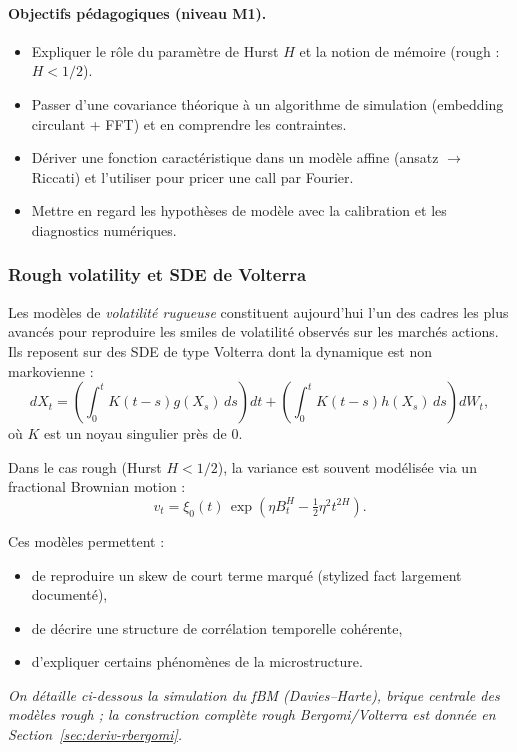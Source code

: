 \documentclass[11pt,a4paper]{article}
\newcommand{\1}{\mathbf{1}}
\begin{document}
\paragraph{Objectifs p\'edagogiques (niveau M1).}
\begin{itemize}
  \item Expliquer le r\^ole du param\`etre de Hurst $H$ et la notion de m\'emoire (rough : $H<1/2$).
  \item Passer d'une covariance th\'eorique \`a un algorithme de simulation (embedding circulant + FFT) et en comprendre les contraintes.
  \item D\'eriver une fonction caract\'eristique dans un mod\`ele affine (ansatz $\rightarrow$ Riccati) et l'utiliser pour pricer une call par Fourier.
  \item Mettre en regard les hypoth\`eses de mod\`ele avec la calibration et les diagnostics num\'eriques.
\end{itemize}

\subsubsection{Rough volatility et SDE de Volterra}

Les mod\`eles de \emph{volatilit\'e rugueuse} constituent aujourd'hui l'un des cadres
les plus avancés pour reproduire les smiles de volatilité observés sur les
marchés actions. Ils reposent sur des SDE de type Volterra dont la dynamique
est non markovienne :
\[
dX_t
=
\left(
 \int_0^t K(t-s) g(X_s)\, ds
\right) dt
+
\left(
 \int_0^t K(t-s) h(X_s)\, ds
\right) dW_t,
\]
o\`u $K$ est un noyau singulier près de $0$.

Dans le cas rough (Hurst $H<1/2$), la variance est souvent modélisée via un
fractional Brownian motion :
\[
v_t =
\xi_0(t)\,
\exp\!\left(
\eta B_t^H - \tfrac12 \eta^2 t^{2H}
\right).
\]

Ces mod\`eles permettent :
\begin{itemize}
  \item de reproduire un skew de court terme marqu\'e (stylized fact largement document\'e),
  \item de d\'ecrire une structure de corr\'elation temporelle cohérente,
  \item d'expliquer certains ph\'enom\`enes de la microstructure.
\end{itemize}

\emph{On d\'etaille ci-dessous la simulation du fBM (Davies--Harte), brique centrale des mod\`eles rough ; la construction compl\`ete rough Bergomi/Volterra est donn\'ee en Section~\ref{sec:deriv-rbergomi}.}
\end{document}

